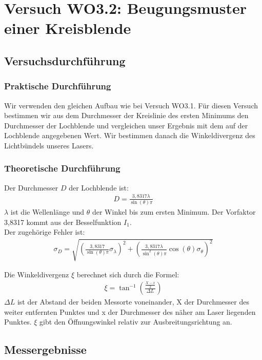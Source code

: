 \documentclass[12pt]{scrartcl}
\begin{document}
\section{Versuch WO3.2: Beugungsmuster einer Kreisblende}
\subsection{Versuchsdurchführung}

\subsubsection{Praktische Durchführung}
Wir verwenden den gleichen Aufbau wie bei Versuch WO3.1. Für diesen Versuch bestimmen wir aus dem Durchmesser der Kreislinie des ersten Minimums den Durchmesser der Lochblende und vergleichen unser Ergebnis mit dem auf der Lochblende angegebenen Wert. Wir bestimmen danach die Winkeldivergenz des Lichtbündels unseres Lasers.
\subsubsection{Theoretische Durchführung}
Der Durchmesser $D$ der Lochblende ist:
\begin{align}
D = \frac{3,8317 \lambda}{\sin(\theta)\pi}
\label{eqn:D}
\end{align}
$\lambda$ ist die Wellenlänge und $\theta$ der Winkel bis zum ersten Minimum. Der Vorfaktor 3,8317 kommt aus der Besselfunktion $I_1$.\\
Der zugehörige Fehler ist:
\begin{align}
\sigma_D = \sqrt{
\left(\frac{3,8317}{\sin(\theta)\pi}\sigma_\lambda \right)^2+
\left(\frac{3,8317\lambda}{\sin^2(\theta)\pi}\cos(\theta)
\sigma_\theta \right)^2}
\label{eqn:D_sigma}
\end{align}

Die Winkeldivergenz $\xi$ berechnet sich durch die Formel:
\begin{align}
\xi = \tan^{-1}\left(\frac{\frac{X-x}{2}}{\Delta L}\right)
\end{align}
$\Delta L$ ist der Abstand der beiden Messorte voneinander, X der Durchmesser des weiter entfernten Punktes und x der Durchmesser des näher am Laser liegenden Punktes.
$\xi$ gibt den Öffnungswinkel relativ zur Ausbreitungsrichtung an.

\subsection{Messergebnisse}
\end{document}
